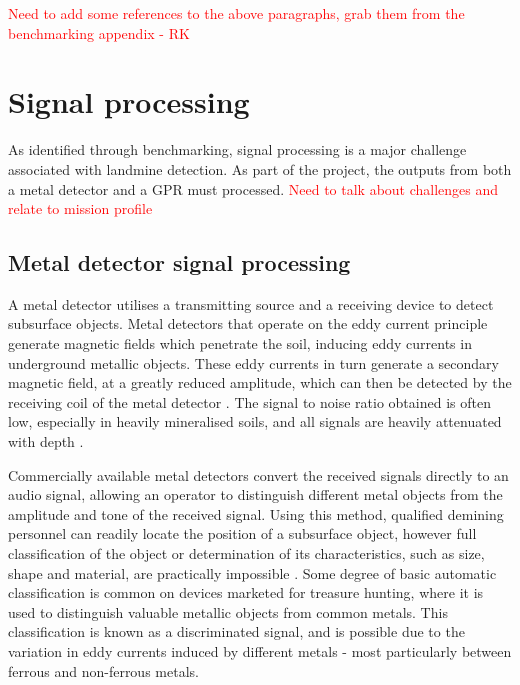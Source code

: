 \documentclass[main.tex]{subfiles}
\begin{document}
\textcolor{red}{Need to add some references to the above paragraphs, grab them from the benchmarking appendix - RK}

\section{Signal processing}
As identified through benchmarking, signal processing is a major challenge associated with landmine detection. As part of the project, the outputs from both a metal detector and a GPR must processed. \textcolor{red}{Need to talk about challenges and relate to mission profile}

\subsection{Metal detector signal processing}
A metal detector utilises a transmitting source and a receiving device to detect subsurface objects. Metal detectors that operate on the eddy current principle generate magnetic fields which penetrate the soil, inducing eddy currents in underground metallic objects. These eddy currents in turn generate a secondary magnetic field, at a greatly reduced amplitude, which can then be detected by the receiving coil of the metal detector \parencite{Candy2008}. The signal to noise ratio obtained is often low, especially in heavily mineralised soils, and all signals are heavily attenuated with depth \parencite{Candy2008}.

Commercially available metal detectors convert the received signals directly to an audio signal, allowing an operator to distinguish different metal objects from the amplitude and tone of the received signal. Using this method, qualified demining personnel can readily locate the position of a subsurface object, however full classification of the object or determination of its characteristics, such as size, shape and material, are practically impossible \parencite{Kruger2006}. Some degree of basic automatic classification is common on devices marketed for treasure hunting, where it is used to distinguish valuable metallic objects from common metals. This classification is known as a discriminated signal, and is possible due to the variation in eddy currents induced by different metals - most particularly between ferrous and non-ferrous metals. 
\end{document}
